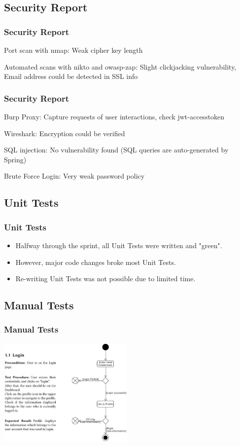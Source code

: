 \documentclass[aspectratio=1610,20pt,utf8]{beamer}
\begin{document}
\subsection{Security Report}
\begin{frame}
\frametitle{Security Report}
\itemize
\item Port scan with nmap: Weak cipher key length
\item Automated scans with nikto and owasp-zap: Slight clickjacking vulnerability, Email address could be detected in SSL info
\end{frame}
\begin{frame}
\frametitle{Security Report}
\itemize
\item Burp Proxy: Capture requests of user interactions, check jwt-accesstoken
\item Wireshark: Encryption could be verified
\item SQL injection: No vulnerability found (SQL queries are auto-generated by Spring)
\item Brute Force Login: Very weak password policy
\end{frame}


\subsection{Unit Tests}
\begin{frame}
\frametitle{Unit Tests}
\begin{itemize}
	\item Halfway through the sprint, all Unit Tests were written and "green". \\
	\item However, major code changes broke most Unit Tests. \\
    \item Re-writing Unit Tests was not possible due to limited time.
\end{itemize}
\end{frame}

\subsection{Manual Tests}
\begin{frame}
\frametitle{Manual Tests}
\begin{center}
\includegraphics[height=200px]{tests.jpg}
\end{center}
\end{frame}
\end{document}
